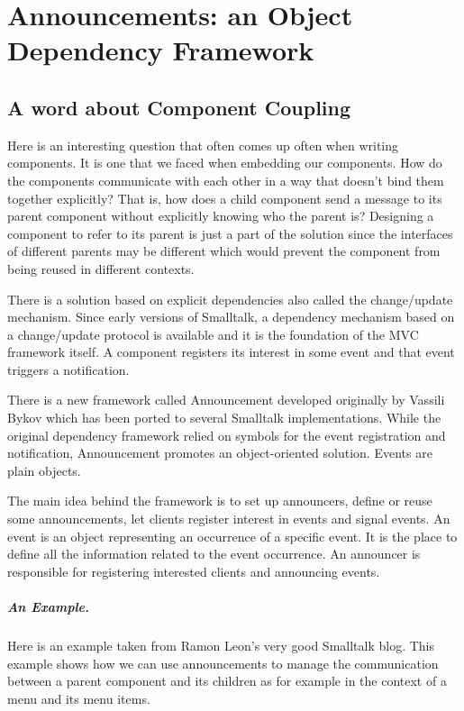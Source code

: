 \documentclass[a4paper,10pt,twoside]{book}
\begin{document}
\fi
\sloppy
\chapter{Announcements: an Object Dependency Framework}


\section{A word about Component Coupling}

Here is an interesting question that often comes up often when writing
components. It is one that we faced when embedding our components. How
do the components communicate with each other in a way that doesn't
bind them together explicitly? That is, how does a child component
send a message to its parent component without explicitly knowing who
the parent is? Designing a component to refer to its parent is just a
part of the solution since the interfaces of different parents may be
different which would prevent the component from being reused in
different contexts.

There is a solution based on explicit dependencies also called the
change/update mechanism. Since early versions of Smalltalk, a
dependency mechanism based on a change/update protocol is available
and it is the foundation of the MVC framework itself. A component
registers its interest in some event and that event triggers a
notification. 

There is a new framework called Announcement developed originally by
Vassili Bykov which has been ported to several Smalltalk
implementations. While the original dependency framework relied on
symbols for the event registration and notification, Announcement
promotes an object-oriented solution. Events are plain objects.

The main idea behind the framework is to set up announcers, define or
reuse some announcements, let clients register interest in events and
signal events. An event is an object representing an occurrence of a
specific event. It is the place to define all the information related
to the event occurrence. An announcer is responsible for registering
interested clients and announcing events. 

\paragraph{An Example.} Here is an example taken from Ramon Leon's
very good Smalltalk blog. This example shows how we can use
announcements to manage the communication between a parent component
and its children as for example in the context of a menu and its menu
items.
\end{document}
